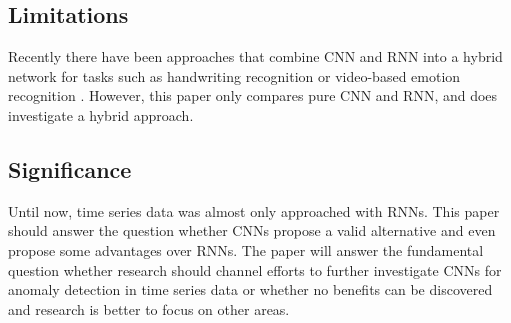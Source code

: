 \subsection{Limitations}

Recently there have been approaches that combine CNN and RNN into a hybrid network for tasks such as handwriting recognition or video-based emotion recognition \parencite{Dutta2018} \parencite{Fan2016}. However, this paper only compares pure CNN and RNN, and does investigate a hybrid approach.


\subsection{Significance}

Until now, time series data was almost only approached with RNNs. This paper should answer the question whether CNNs propose a valid alternative and even propose some advantages over RNNs. The paper will answer the fundamental question whether research should channel efforts to further investigate CNNs for anomaly detection in time series data or whether no benefits can be discovered and research is better to focus on other areas. 



